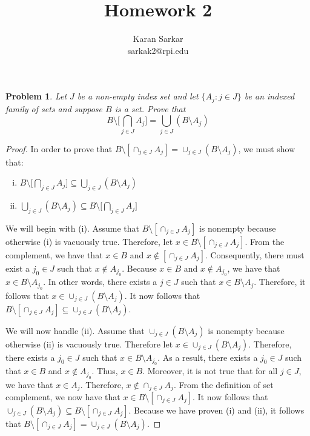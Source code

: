 \documentclass{article}
\title{Homework 2}
\author{Karan Sarkar \\ sarkak2@rpi.edu}
\newtheorem{problem}{Problem}
\begin{document}
\maketitle

\begin{problem}
Let $J$ be a non-empty index set and let $\{A_j:j \in J\}$ be an indexed family of sets and suppose $B$ is a set. 
Prove that $$B \setminus \Big[ \bigcap_{j \in J} A_j \Big]= \bigcup_{j \in J} \left(B \setminus A_j\right)$$  
\end{problem}

\begin{proof}
In order to prove that $B \setminus [ \cap_{j \in J} A_j ]= \cup_{j \in J} \left(B \setminus A_j\right)$, we must show that:
\begin{enumerate}[(i)]
    \item $B \setminus \Big[ \bigcap_{j \in J} A_j \Big] \subseteq \bigcup_{j \in J} \left(B \setminus A_j\right)$  
    \item $\bigcup_{j \in J} \left(B \setminus A_j\right) \subseteq B \setminus \Big[ \bigcap_{j \in J} A_j \Big]$
\end{enumerate}
We will begin with (i). Assume that $B \setminus [ \cap_{j \in J} A_j ]$ is nonempty because otherwise (i) is vacuously true. Therefore, let $x \in B \setminus [ \cap_{j \in J} A_j ]$. From the complement, we have that $x \in B$ and $x \not \in [ \cap_{j \in J} A_j ]$. Consequently, there must exist a $j_0 \in J$ such that $x \not \in A_{j_0}$. Because $x \in B$ and $x \not \in A_{j_0}$, we have that $x \in B \setminus A_{j_0}$. In other words, there exists a $j \in J$ such that $x \in B \setminus A_j$. Therefore, it follows that $x \in \cup_{j \in J} \left(B \setminus A_j\right)$. It now follows that $B \setminus [ \cap_{j \in J} A_j ] \subseteq \cup_{j \in J} \left(B \setminus A_j\right)$.

We will now handle (ii). Assume that $\cup_{j \in J} \left(B \setminus A_j\right)$ is nonempty because otherwise (ii) is vacuously true. Therefore let $x \in \cup_{j \in J} \left(B \setminus A_j\right)$. Therefore, there exists a $j_0 \in J$ such that $x \in B \setminus A_{j_0}$. As a result, there exists a $j_0 \in J$ such that $x \in B$ and $x \not \in A_{j_0}$. Thus, $x \in B$. Moreover, it is not true that for all $j \in J$, we have that $x \in A_j$. Therefore, $x \not \in \cap_{j \in J} A_j$. From the definition of set complement, we now have that $x \in B \setminus [\cap_{j \in J} A_j]$. It now follows that $\cup_{j \in J} \left(B \setminus A_j\right) \subseteq  B \setminus [\cap_{j \in J} A_j]$. Because we have proven (i) and (ii), it follows that  $B \setminus [ \cap_{j \in J} A_j ]= \cup_{j \in J} \left(B \setminus A_j\right)$.

\end{proof}
\end{document}

